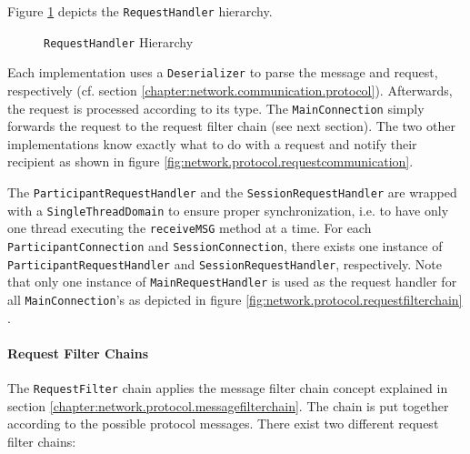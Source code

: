 Figure \ref{fig:network.protocol.requesthandler.uml} depicts the \texttt{RequestHandler} hierarchy.

\begin{figure}[H]
 \centering
 \caption{\texttt{RequestHandler} Hierarchy}
 \label{fig:network.protocol.requesthandler.uml}
\end{figure}

Each implementation uses a \texttt{Deserializer} to parse the message and request, respectively (cf. section \ref{chapter:network.communication.protocol}). Afterwards, the request is processed according to its type. The \texttt{MainConnection} simply forwards the request to the request filter chain (see next section). The two other implementations know exactly what to do with a request and notify their recipient as shown in figure \ref{fig:network.protocol.requestcommunication}.

The \texttt{ParticipantRequestHandler} and the \texttt{SessionRequestHandler} are wrapped with a \texttt{SingleThreadDomain} to ensure proper synchronization, i.e. to have only one thread executing the \texttt{receiveMSG} method at a time. For each \texttt{ParticipantConnection} and \texttt{SessionConnection}, there exists one instance of \texttt{ParticipantRequestHandler} and \texttt{SessionRequestHandler}, respectively. Note that only one instance of \texttt{MainRequestHandler} is used as the request handler for all \texttt{MainConnection}'s as depicted in figure \ref{fig:network.protocol.requestfilterchain} .


\paragraph{Request Filter Chains}
\label{chapter:networkfilterchains}

The \texttt{RequestFilter} chain applies the message filter chain concept explained in section \ref{chapter:network.protocol.messagefilterchain}. The chain is put together according to the possible protocol messages. There exist two different request filter chains: 

